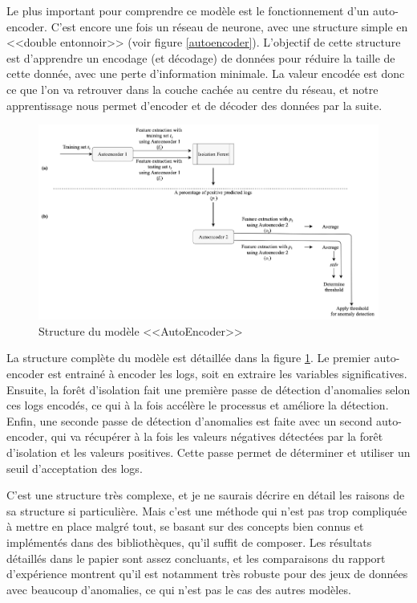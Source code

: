 \documentclass[openany, 11pt]{memoir}
\begin{document}
\bigskip
Le plus important pour comprendre ce modèle est le fonctionnement d'un auto-encoder. C'est encore une fois un réseau de neurone, avec une structure simple en <<double entonnoir>> (voir figure \ref{autoencoder}). L'objectif de cette structure est d'apprendre un encodage (et décodage) de données pour réduire la taille de cette donnée, avec une perte d'information minimale. La valeur encodée est donc ce que l'on va retrouver dans la couche cachée au centre du réseau, et notre apprentissage nous permet d'encoder et de décoder des données par la suite.

\begin{figure}[ht]
	\centering
	\includegraphics[width=\textwidth]{images/modeleautoencoder.png}
	\caption{Structure du modèle <<AutoEncoder>>}
	\label{modeleautoencoder}
\end{figure}

\bigskip
La structure complète du modèle est détaillée dans la figure \ref{modeleautoencoder}. Le premier auto-encoder est entrainé à encoder les \glspl{log}, soit en extraire les variables significatives. Ensuite, la forêt d'isolation fait une première passe de détection d'anomalies selon ces logs encodés, ce qui à la fois accélère le processus et améliore la détection. Enfin, une seconde passe de détection d'anomalies est faite avec un second auto-encoder, qui va récupérer à la fois les valeurs négatives détectées par la forêt d'isolation et les valeurs positives. Cette passe permet de déterminer et utiliser un seuil d'acceptation des logs.

C'est une structure très complexe, et je ne saurais décrire en détail les raisons de sa structure si particulière. Mais c'est une méthode qui n'est pas trop compliquée à mettre en place malgré tout, se basant sur des concepts bien connus et implémentés dans des bibliothèques, qu'il suffit de composer. Les résultats détaillés dans le papier sont assez concluants, et les comparaisons du rapport d'expérience \cite{experiencereport} montrent qu'il est notamment très robuste pour des jeux de données avec beaucoup d'anomalies, ce qui n'est pas le cas des autres modèles.
\end{document}
